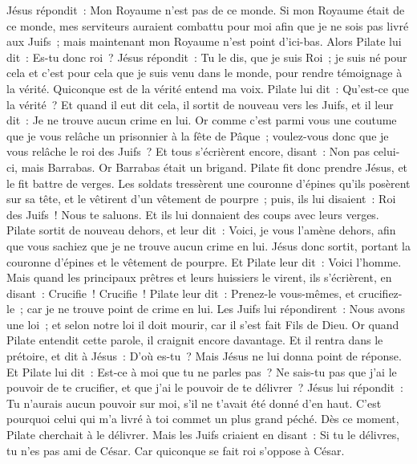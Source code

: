 \begin{multicols}{2}
Jésus répondit~: Mon Royaume n'est pas de ce monde. Si mon Royaume était de ce monde, mes serviteurs auraient combattu pour moi afin que je ne sois pas livré aux Juifs~; mais maintenant mon Royaume n'est point d'ici-bas.
Alors Pilate lui dit~: Es-tu donc roi~? Jésus répondit~: Tu le dis, que je suis Roi~; je suis né pour cela et c'est pour cela que je suis venu dans le monde, pour rendre témoignage à la vérité. Quiconque est de la vérité entend ma voix.
Pilate lui dit~: Qu'est-ce que la vérité~? Et quand il eut dit cela, il sortit de nouveau vers les Juifs, et il leur dit~: Je ne trouve aucun crime en lui.
Or comme c'est parmi vous une coutume que je vous relâche un prisonnier à la fête de Pâque~; voulez-vous donc que je vous relâche le roi des Juifs~?
Et tous s'écrièrent encore, disant~: Non pas celui-ci, mais Barrabas. Or Barrabas était un brigand.
\VerseOne{}Pilate fit donc prendre Jésus, et le fit battre de verges.
Les soldats tressèrent une couronne d'épines qu'ils posèrent sur sa tête, et le vêtirent d'un vêtement de pourpre~;
puis, ils lui disaient~: Roi des Juifs~! Nous te saluons. Et ils lui donnaient des coups avec leurs verges.
Pilate sortit de nouveau dehors, et leur dit~: Voici, je vous l'amène dehors, afin que vous sachiez que je ne trouve aucun crime en lui.
Jésus donc sortit, portant la couronne d'épines et le vêtement de pourpre. Et Pilate leur dit~: Voici l'homme.
Mais quand les principaux prêtres et leurs huissiers le virent, ils s'écrièrent, en disant~: Crucifie~! Crucifie~! Pilate leur dit~: Prenez-le vous-mêmes, et crucifiez-le~; car je ne trouve point de crime en lui.
Les Juifs lui répondirent~: Nous avons une loi~; et selon notre loi il doit mourir, car il s'est fait Fils de Dieu.
Or quand Pilate entendit cette parole, il craignit encore davantage.
Et il rentra dans le prétoire, et dit à Jésus~: D'où es-tu~? Mais Jésus ne lui donna point de réponse.
Et Pilate lui dit~: Est-ce à moi que tu ne parles pas~? Ne sais-tu pas que j'ai le pouvoir de te crucifier, et que j'ai le pouvoir de te délivrer~?
Jésus lui répondit~: Tu n'aurais aucun pouvoir sur moi, s'il ne t'avait été donné d'en haut. C'est pourquoi celui qui m'a livré à toi commet un plus grand péché.
Dès ce moment, Pilate cherchait à le délivrer. Mais les Juifs criaient en disant~: Si tu le délivres, tu n'es pas ami de César. Car quiconque se fait roi s'oppose à César.

\end{multicols}

